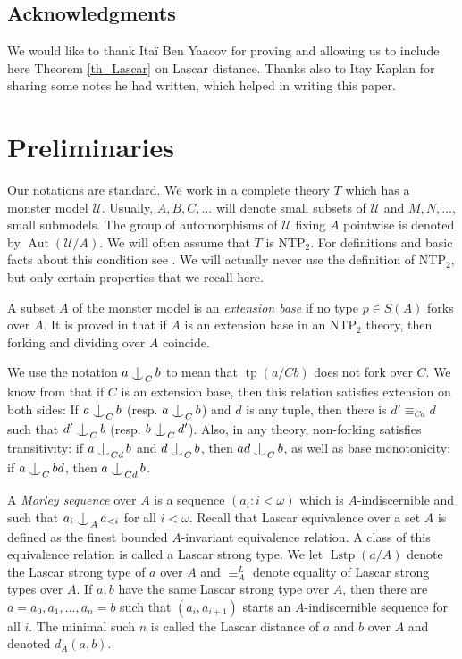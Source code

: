 \documentclass{amsart}
\makeatletter
\numberwithin{equation}{section}
\theoremstyle{definition}
\theoremstyle{mystyle}
\theoremstyle{remark}
\newcommand{\monster}{\mathcal U}
\DeclareMathOperator{\tp}{tp}
\DeclareMathOperator{\Lstp}{Lstp}
\DeclareMathOperator{\Aut}{Aut}
\def\indsym#1#2{%
 \setbox0=\hbox{$\m@th#1x$}%
 \kern\wd0%
 \hbox to 0pt{\hss$\m@th#1\mid$\hbox to 0pt{$\m@th#1^{#2}$\hss}\hss}%
 \lower.9\ht0\hbox to 0pt{\hss$\m@th#1\smile$\hss}%
 \kern\wd0}
\newcommand{\ind}[1][]{\mathop{\mathpalette\indsym{#1}}}
\makeatother
\begin{document}
\subsection*{Acknowledgments}

We would like to thank Ita\"i Ben Yaacov for proving and allowing us to include here Theorem \ref{th_Lascar} on Lascar distance. Thanks also to Itay Kaplan for sharing some notes he had written, which helped in writing this paper.

\section{Preliminaries}

Our notations are standard. We work in a complete theory $T$ which has a monster model $\monster$. Usually, $A,B,C,\ldots$ will denote small subsets of $\monster$ and $M,N,\ldots$, small submodels. The group of automorphisms of $\monster$ fixing $A$ pointwise is denoted by $\Aut(\monster/A)$. We will often assume that $T$ is NTP$_2$. For definitions and basic facts about this condition see \cite{CherKapl}. We will actually never use the definition of NTP$_2$, but only certain properties that we recall here.

A subset $A$ of the monster model is an \emph{extension base} if no type $p\in S(A)$ forks over $A$. It is proved in \cite{CherKapl} that if $A$ is an extension base in an NTP$_2$ theory, then forking and dividing over $A$ coincide.

We use the notation $a\ind_C b$ to mean that $\tp(a/Cb)$ does not fork over $C$. We know from \cite{CherKapl} that if $C$ is an extension base, then this relation satisfies extension on both sides: If $a\ind_C b$ (resp. $a\ind_C b$) and $d$ is any tuple, then there is $d'\equiv_{Ca} d$ such that $d'\ind_C b$ (resp. $b\ind_C d'$). Also, in any theory, non-forking satisfies transitivity: if $a\ind_{Cd} b$ and $d\ind_C b$, then $ad\ind_C b$, as well as base monotonicity: if $a\ind_C bd$, then $a\ind_{Cd} b$.

A \emph{Morley sequence} over $A$ is a sequence $(a_i:i<\omega)$ which is $A$-indiscernible and such that $a_i \ind_A a_{<i}$ for all $i<\omega$. 
Recall that Lascar equivalence over a set $A$ is defined as the finest bounded $A$-invariant equivalence relation. A class of this equivalence relation is called a Lascar strong type. We let $\Lstp(a/A)$ denote the Lascar strong type of $a$ over $A$ and $\equiv_A^L$ denote equality of Lascar strong types over $A$. If $a,b$ have the same Lascar strong type over $A$, then there are $a=a_0,a_1,\ldots,a_n=b$ such that $(a_i,a_{i+1})$ starts an $A$-indiscernible sequence for all $i$. The minimal such $n$ is called the Lascar distance of $a$ and $b$ over $A$ and denoted $d_A(a,b)$.
\end{document}
